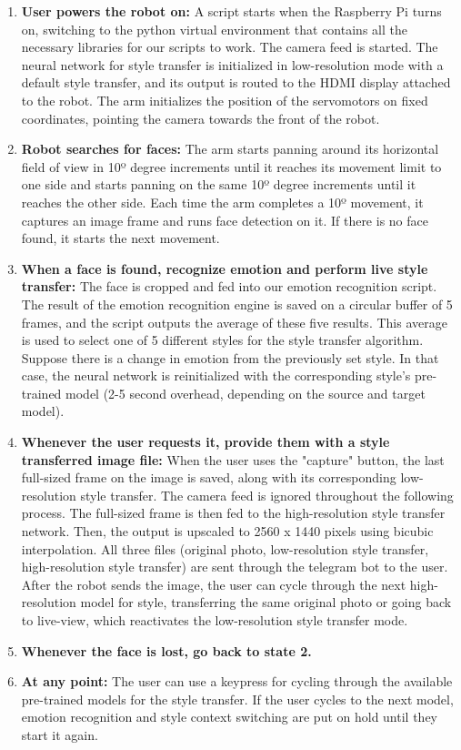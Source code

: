 \begin{enumerate}
  \item \textbf{User powers the robot on:} A script starts when the Raspberry Pi turns on, switching to the python virtual environment that contains all the necessary libraries for our scripts to work. The camera feed is started. The neural network for style transfer is initialized in low-resolution mode with a default style transfer, and its output is routed to the HDMI display attached to the robot. The arm initializes the position of the servomotors on fixed coordinates, pointing the camera towards the front of the robot.   
  \item \textbf{Robot searches for faces:} The arm starts panning around its horizontal field of view in 10º degree increments until it reaches its movement limit to one side and starts panning on the same 10º degree increments until it reaches the other side. Each time the arm completes a 10º movement, it captures an image frame and runs face detection on it. If there is no face found, it starts the next movement.
  \item \textbf{When a face is found, recognize emotion and perform live style transfer:} The face is cropped and fed into our emotion recognition script. The result of the emotion recognition engine is saved on a circular buffer of 5 frames, and the script outputs the average of these five results. This average is used to select one of 5 different styles for the style transfer algorithm. Suppose there is a change in emotion from the previously set style. In that case, the neural network is reinitialized with the corresponding style's pre-trained model (2-5 second overhead, depending on the source and target model).
  \item \textbf{Whenever the user requests it, provide them with a style transferred image file:} When the user uses the "capture" button, the last full-sized frame on the image is saved, along with its corresponding low-resolution style transfer. The camera feed is ignored throughout the following process. The full-sized frame is then fed to the high-resolution style transfer network. Then, the output is upscaled to 2560 x 1440 pixels using bicubic interpolation. All three files (original photo, low-resolution style transfer, high-resolution style transfer) are sent through the telegram bot to the user. After the robot sends the image, the user can cycle through the next high-resolution model for style, transferring the same original photo or going back to live-view, which reactivates the low-resolution style transfer mode.
  \item \textbf{Whenever the face is lost, go back to state 2.}
  \item \textbf{At any point:} The user can use a keypress for cycling through the available pre-trained models for the style transfer. If the user cycles to the next model, emotion recognition and style context switching are put on hold until they start it again.
\end{enumerate}